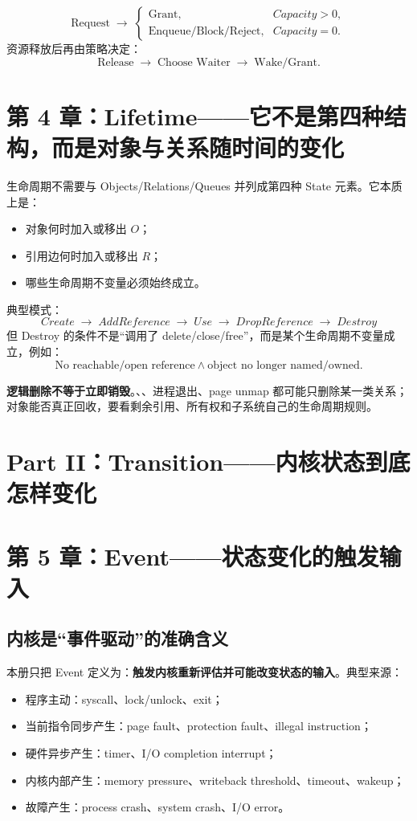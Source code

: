\documentclass[11pt,a4paper]{ctexart}
\newcommand{\kw}[1]{\textbf{#1}}
\newcommand{\code}[1]{\texttt{\detokenize{#1}}}
\newcommand{\arr}{\;\longrightarrow\;}
\begin{document}
\begin{statebox}[需求大于供给时的通用状态变化]
\[
\text{Request}\arr
\begin{cases}
\text{Grant}, & Capacity>0,\\
\text{Enqueue/Block/Reject}, & Capacity=0.
\end{cases}
\]
资源释放后再由策略决定：
\[
\text{Release}\arr\text{Choose Waiter}\arr\text{Wake/Grant}.
\]
\end{statebox}

\section{第 4 章：Lifetime——它不是第四种结构，而是对象与关系随时间的变化}

生命周期不需要与 Objects/Relations/Queues 并列成第四种 State 元素。它本质上是：
\begin{itemize}
  \item 对象何时加入或移出 $O$；
  \item 引用边何时加入或移出 $R$；
  \item 哪些生命周期不变量必须始终成立。
\end{itemize}

典型模式：
\[
\boxed{
Create\arr AddReference\arr Use\arr DropReference\arr Destroy
}
\]
但 Destroy 的条件不是“调用了 delete/close/free”，而是某个生命周期不变量成立，例如：
\[
\text{No reachable/open reference}\land\text{object no longer named/owned}.
\]

\begin{warn}[高频错误]
\kw{逻辑删除不等于立即销毁}。\code{unlink()}、\code{close()}、进程退出、page unmap 都可能只删除某一类关系；对象能否真正回收，要看剩余引用、所有权和子系统自己的生命周期规则。
\end{warn}

\newpage
\section{Part II：Transition——内核状态到底怎样变化}

\section{第 5 章：Event——状态变化的触发输入}

\subsection{内核是“事件驱动”的准确含义}
本册只把 Event 定义为：\kw{触发内核重新评估并可能改变状态的输入}。典型来源：
\begin{itemize}
  \item 程序主动：syscall、lock/unlock、exit；
  \item 当前指令同步产生：page fault、protection fault、illegal instruction；
  \item 硬件异步产生：timer、I/O completion interrupt；
  \item 内核内部产生：memory pressure、writeback threshold、timeout、wakeup；
  \item 故障产生：process crash、system crash、I/O error。
\end{itemize}
\end{document}
